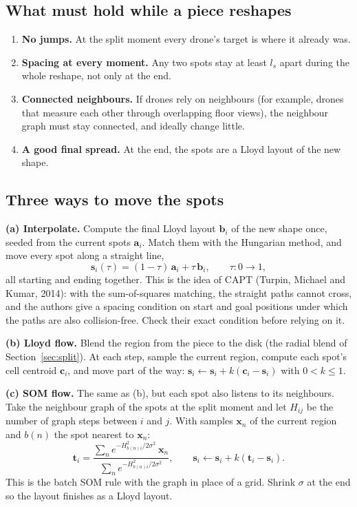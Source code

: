 \documentclass[11pt,a4paper]{article}
\newcommand{\vect}[1]{\mathbf{#1}}
\begin{document}
\subsection{What must hold while a piece reshapes}
\begin{enumerate}[leftmargin=*]
\item \textbf{No jumps.} At the split moment every drone's target is where it already was.
\item \textbf{Spacing at every moment.} Any two spots stay at least $l_s$ apart during the whole reshape, not only
at the end.
\item \textbf{Connected neighbours.} If drones rely on neighbours (for example, drones that measure each other
through overlapping floor views), the neighbour graph must stay connected, and ideally change little.
\item \textbf{A good final spread.} At the end, the spots are a Lloyd layout of the new shape.
\end{enumerate}

\subsection{Three ways to move the spots}

\textbf{(a) Interpolate.} Compute the final Lloyd layout $\vect{b}_i$ of the new shape once, seeded from the current
spots $\vect{a}_i$. Match them with the Hungarian method, and move every spot along a straight line,
\[
\vect{s}_i(\tau)=(1-\tau)\,\vect{a}_i+\tau\,\vect{b}_i,\qquad \tau:0\to1,
\]
all starting and ending together. This is the idea of CAPT (Turpin, Michael and Kumar, 2014): with the
sum-of-squares matching, the straight paths cannot cross, and the authors give a spacing condition on start and goal
positions under which the paths are also collision-free. Check their exact condition before relying on it.

\textbf{(b) Lloyd flow.} Blend the region from the piece to the disk (the radial blend of Section~\ref{sec:split}).
At each step, sample the current region, compute each spot's cell centroid $\vect{c}_i$, and move part of the way:
$\vect{s}_i\leftarrow\vect{s}_i+k(\vect{c}_i-\vect{s}_i)$ with $0<k\le1$.

\textbf{(c) SOM flow.} The same as (b), but each spot also listens to its neighbours. Take the neighbour graph of
the spots at the split moment and let $H_{ij}$ be the number of graph steps between $i$ and $j$. With samples
$\vect{x}_n$ of the current region and $b(n)$ the spot nearest to $\vect{x}_n$:
\[
\vect{t}_i=\frac{\sum_n e^{-H_{b(n)i}^2/2\sigma^2}\ \vect{x}_n}{\sum_n e^{-H_{b(n)i}^2/2\sigma^2}},\qquad
\vect{s}_i\leftarrow\vect{s}_i+k(\vect{t}_i-\vect{s}_i).
\]
This is the batch SOM rule with the graph in place of a grid. Shrink $\sigma$ at the end so the layout finishes as a
Lloyd layout.
\end{document}
